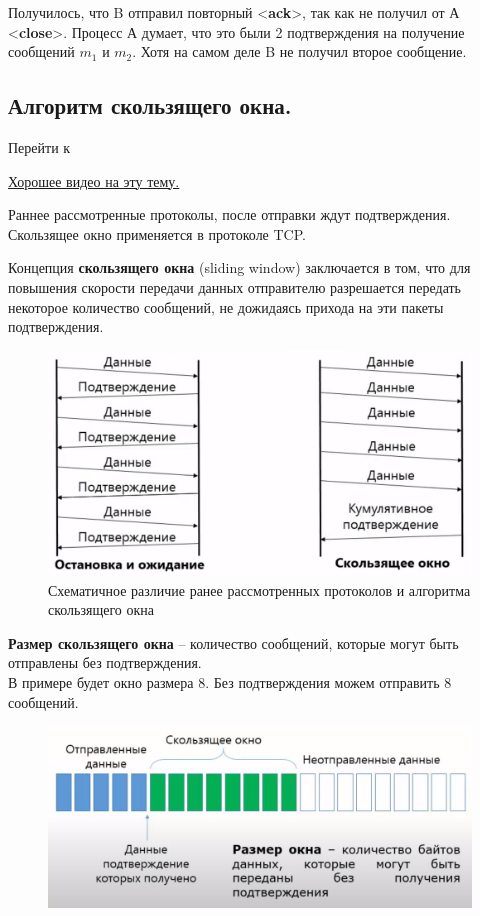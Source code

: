 Получилось, что B отправил повторный <\textbf{ack}>, так как не получил от А  <\textbf{close}>. Процесс А думает, что это были 2 подтверждения на получение сообщений $m_1$ и $m_2$. Хотя на самом деле B не получил второе сообщение.

\subsection*{Алгоритм скользящего окна.}\label{b18:part2}

Перейти к~

\href{https://www.youtube.com/watch?v=hd6QNXK5rPk}{Хорошее видео на эту тему.}

Раннее рассмотренные протоколы, после отправки ждут подтверждения. Скользящее окно применяется в протоколе TCP.

Концепция \textbf{скользящего окна} (sliding window) заключается в том, что для повышения скорости передачи данных отправителю разрешается передать некоторое количество сообщений, не дожидаясь прихода на эти пакеты подтверждения.

\begin{figure}[H] \centering
	\includegraphics[scale = 0.35]{18/send_types.png}
	\caption{Схематичное различие ранее рассмотренных протоколов и алгоритма скользящего окна}
\end{figure}

\textbf{Размер скользящего окна} -- количество сообщений, которые могут быть отправлены без подтверждения. \\
В примере будет окно размера 8. Без подтверждения можем отправить 8 сообщений.
\begin{figure}[H] \centering
	\includegraphics[scale = 0.3]{18/window_1.png}
\end{figure}

